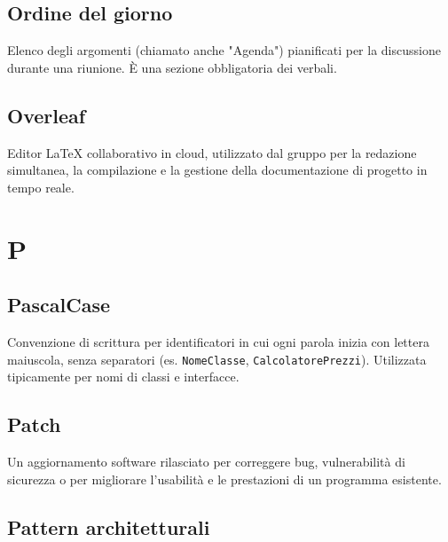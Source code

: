 \documentclass[a4paper, 11pt, oneside]{scrartcl} %
\begin{document}
\vspace{0.5cm}

\subsection*{Ordine del giorno}


Elenco degli argomenti (chiamato anche "Agenda") pianificati per la discussione durante una riunione. È una sezione obbligatoria dei verbali.

\vspace{0.5cm}

\subsection*{Overleaf}
Editor LaTeX collaborativo in cloud, utilizzato dal gruppo per la redazione simultanea, la compilazione e la gestione della documentazione di progetto in tempo reale.
\vspace{0.5cm}


\section*{P}


\subsection*{PascalCase}
Convenzione di scrittura per identificatori in cui ogni parola inizia con lettera maiuscola, senza separatori (es. \texttt{NomeClasse}, \texttt{CalcolatorePrezzi}). Utilizzata tipicamente per nomi di classi e interfacce.
\vspace{0.5cm}

\subsection*{Patch}
Un aggiornamento software rilasciato per correggere bug, vulnerabilità di sicurezza o per migliorare l'usabilità e le prestazioni di un programma esistente.
\vspace{0.5cm}

\subsection*{Pattern architetturali}
\end{document}
